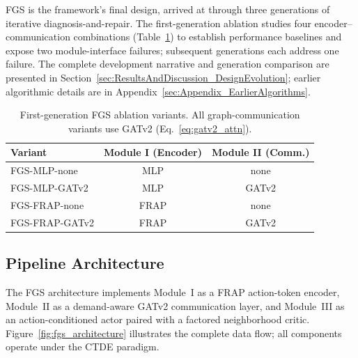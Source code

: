 FGS is the framework's final design, arrived at through three generations of iterative diagnosis-and-repair. The first-generation ablation studies four encoder--communication combinations (Table~\ref{tab:fgs_variants}) to establish performance baselines and expose two module-interface failures; subsequent generations each address one failure. The complete development narrative and generation comparison are presented in Section~\ref{sec:ResultsAndDiscussion_DesignEvolution}; earlier algorithmic details are in Appendix~\ref{sec:Appendix_EarlierAlgorithms}.

\begin{table}[ht]
  \centering
  \caption{First-generation FGS ablation variants. All graph-communication variants use GATv2 (Eq.~\ref{eq:gatv2_attn}).}
  \label{tab:fgs_variants}
  \begin{tabular}{lcc}
    \hline
    Variant          & Module I (Encoder) & Module II (Comm.) \\
    \hline
    FGS-MLP-none     & MLP                & none    \\
    FGS-MLP-GATv2    & MLP                & GATv2   \\
    FGS-FRAP-none    & FRAP               & none    \\
    FGS-FRAP-GATv2   & FRAP               & GATv2   \\
    \hline
  \end{tabular}
\end{table}



\subsection{Pipeline Architecture}
\label{sec:Methodology_PipelineArchitecture}

The FGS architecture implements Module~I as a FRAP action-token encoder, Module~II as a demand-aware GATv2 communication layer, and Module~III as an action-conditioned actor paired with a factored neighborhood critic. Figure~\ref{fig:fgs_architecture} illustrates the complete data flow; all components operate under the CTDE paradigm.

